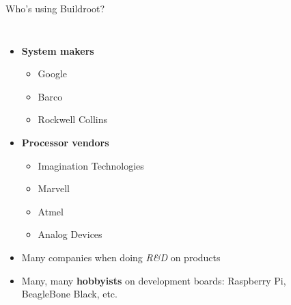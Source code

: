 \begin{frame}{Who's using Buildroot?}
  \begin{columns}
    \begin{itemize}
    \item {\bf System makers}
      \begin{itemize}
      \item Google
      \item Barco
      \item Rockwell Collins
      \end{itemize}
    \item {\bf Processor vendors}
      \begin{itemize}
      \item Imagination Technologies
      \item Marvell
      \item Atmel
      \item Analog Devices
      \end{itemize}
    \item Many companies when doing {\em R\&D} on products
    \item Many, many {\bf hobbyists} on development boards:
      Raspberry Pi, BeagleBone Black, etc.
  \end{itemize}
  \\
  \\

\end{columns}
\end{frame}
